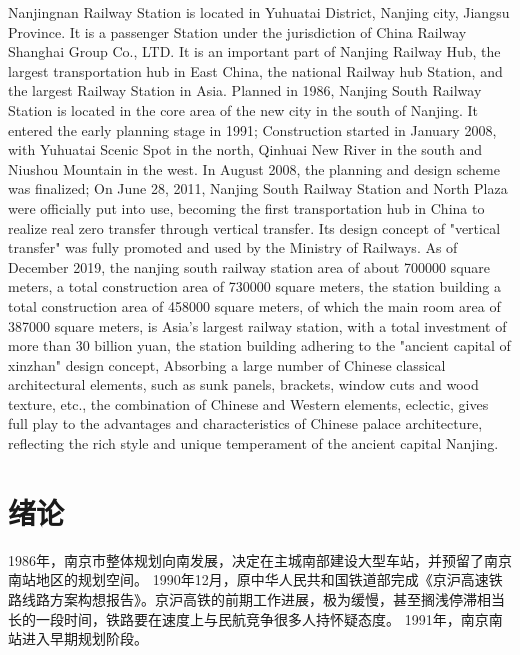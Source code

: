 \documentclass[bachelor]{njupthesis}
\begin{document}
\begin{englishabstract}
Nanjingnan Railway Station is located in Yuhuatai District, Nanjing city, Jiangsu Province. It is a passenger Station under the jurisdiction of China Railway Shanghai Group Co., LTD. It is an important part of Nanjing Railway Hub, the largest transportation hub in East China, the national Railway hub Station, and the largest Railway Station in Asia.
Planned in 1986, Nanjing South Railway Station is located in the core area of the new city in the south of Nanjing. It entered the early planning stage in 1991; Construction started in January 2008, with Yuhuatai Scenic Spot in the north, Qinhuai New River in the south and Niushou Mountain in the west. In August 2008, the planning and design scheme was finalized; On June 28, 2011, Nanjing South Railway Station and North Plaza were officially put into use, becoming the first transportation hub in China to realize real zero transfer through vertical transfer. Its design concept of "vertical transfer" was fully promoted and used by the Ministry of Railways.
As of December 2019, the nanjing south railway station area of about 700000 square meters, a total construction area of 730000 square meters, the station building a total construction area of 458000 square meters, of which the main room area of 387000 square meters, is Asia's largest railway station, with a total investment of more than 30 billion yuan, the station building adhering to the "ancient capital of xinzhan" design concept, Absorbing a large number of Chinese classical architectural elements, such as sunk panels, brackets, window cuts and wood texture, etc., the combination of Chinese and Western elements, eclectic, gives full play to the advantages and characteristics of Chinese palace architecture, reflecting the rich style and unique temperament of the ancient capital Nanjing.

\end{englishabstract}

\thesistableofcontents

\thesischapterexordium

\chapter{绪论}
1986年，南京市整体规划向南发展，决定在主城南部建设大型车站，并预留了南京南站地区的规划空间。
1990年12月，原中华人民共和国铁道部完成《京沪高速铁路线路方案构想报告》。京沪高铁的前期工作进展，极为缓慢，甚至搁浅停滞相当长的一段时间，铁路要在速度上与民航竞争很多人持怀疑态度。
1991年，南京南站进入早期规划阶段。
\end{document}

